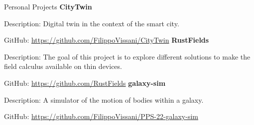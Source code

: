 \begin{rubric}{Personal Projects}
\entry*[2023] \textbf{CityTwin}
\par Description: Digital twin in the context of the smart city.
\par GitHub: \url{https://github.com/FilippoVissani/CityTwin}
%
\entry*[2023] \textbf{RustFields}
\par Description: The goal of this project is to explore different solutions to make the field calculus available on thin devices.
\par GitHub: \url{https://github.com/RustFields}
%
\entry*[2022] \textbf{galaxy-sim}
\par Description: A simulator of the motion of bodies within a galaxy.
\par GitHub: \url{https://github.com/FilippoVissani/PPS-22-galaxy-sim}

\end{rubric}